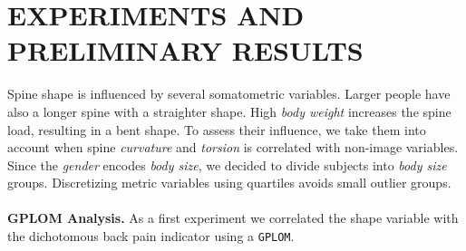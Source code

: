 \documentclass[a4paper,twoside]{style/article}
\begin{document}
\section{\uppercase{Experiments and Preliminary Results}}
\label{sec:Experiments}
\noindent Spine shape is influenced by several somatometric variables.
Larger people have also a longer spine with a straighter shape.
High \emph{body weight} increases the spine load, resulting in a bent shape.
To assess their influence, we take them into account when spine \emph{curvature} and \emph{torsion} is correlated with non-image variables.
Since the \emph{gender} encodes \emph{body size}, we decided to divide subjects into \emph{body size} groups.
Discretizing metric variables using quartiles avoids small outlier groups.
\\\\
\noindent \textbf{GPLOM Analysis.}
As a first experiment we correlated the shape variable with the dichotomous back pain indicator using a \texttt{GPLOM}.
\end{document}
